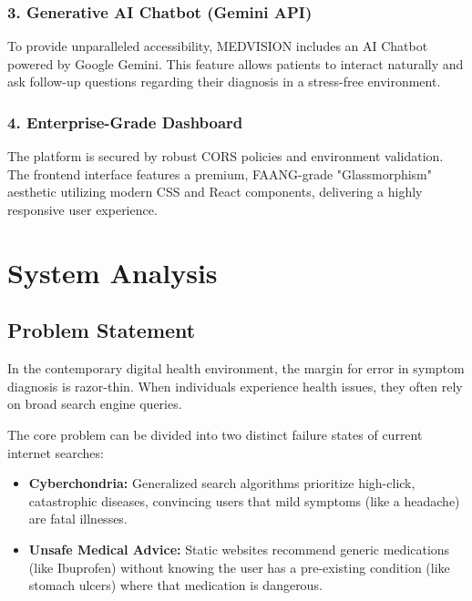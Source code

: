\documentclass[12pt,a4paper]{report}
\begin{document}
\subsection{3. Generative AI Chatbot (Gemini API)}
To provide unparalleled accessibility, MEDVISION includes an AI Chatbot powered by Google Gemini. This feature allows patients to interact naturally and ask follow-up questions regarding their diagnosis in a stress-free environment.

\subsection{4. Enterprise-Grade Dashboard}
The platform is secured by robust CORS policies and environment validation. The frontend interface features a premium, FAANG-grade "Glassmorphism" aesthetic utilizing modern CSS and React components, delivering a highly responsive user experience.

\chapter{System Analysis}

\section{Problem Statement}
In the contemporary digital health environment, the margin for error in symptom diagnosis is razor-thin. When individuals experience health issues, they often rely on broad search engine queries. 

The core problem can be divided into two distinct failure states of current internet searches:
\begin{itemize}
    \item \textbf{Cyberchondria:} Generalized search algorithms prioritize high-click, catastrophic diseases, convincing users that mild symptoms (like a headache) are fatal illnesses.
    \item \textbf{Unsafe Medical Advice:} Static websites recommend generic medications (like Ibuprofen) without knowing the user has a pre-existing condition (like stomach ulcers) where that medication is dangerous.
\end{itemize}
\end{document}
